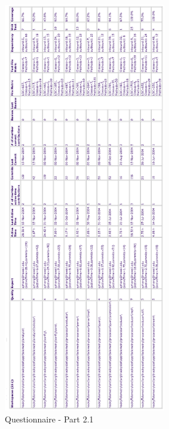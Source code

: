 \begin{figure}[htbp]
  \centering
  \includegraphics[width=0.63\textwidth]{figs/2004-11-18-hackyTelemetry.eps}
  \caption{Questionnaire - Part 2.1}
  \label{fig:questionnaire2.1}
\end{figure}

